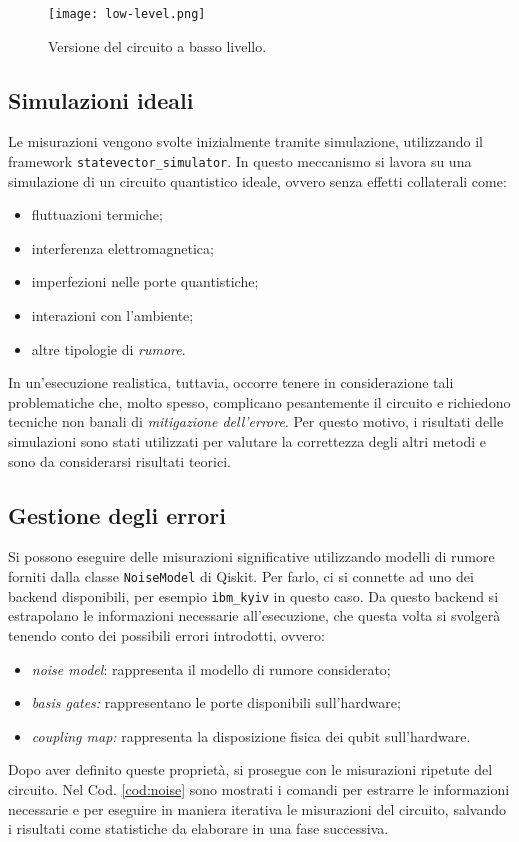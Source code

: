 \begin{figure}[ht]
    \texttt{[image: low-level.png]}
    \caption{Versione del circuito a basso livello.}
\end{figure}

\subsection{Simulazioni ideali}
Le misurazioni vengono svolte inizialmente tramite simulazione, utilizzando 
il framework \texttt{statevector\_simulator}. In questo meccanismo si lavora su 
una simulazione di un circuito quantistico ideale, ovvero senza effetti collaterali come:
\begin{itemize}
    \item fluttuazioni termiche;
    \item interferenza elettromagnetica;
    \item imperfezioni nelle porte quantistiche;
    \item interazioni con l'ambiente;
    \item altre tipologie di \textit{rumore}.
\end{itemize}
In un'esecuzione realistica, tuttavia, occorre tenere in considerazione
tali problematiche che, molto spesso, complicano pesantemente
il circuito e richiedono tecniche non banali di \textit{mitigazione dell'errore}.
Per questo motivo, i risultati delle simulazioni sono stati utilizzati per 
valutare la correttezza degli altri metodi e sono da considerarsi risultati teorici.

\subsection{Gestione degli errori}
Si possono eseguire delle misurazioni significative utilizzando modelli 
di rumore forniti dalla classe \texttt{NoiseModel} di Qiskit. 
Per farlo, ci si connette ad uno dei backend disponibili, per esempio 
\texttt{ibm\_kyiv} in questo caso. Da questo backend si estrapolano le 
informazioni necessarie all'esecuzione, che questa volta si svolgerà
tenendo conto dei possibili errori introdotti, ovvero:
\begin{itemize}
	\item \emph{noise model}: rappresenta il modello di rumore considerato;
		\item \emph{basis gates:} rappresentano le porte disponibili sull'hardware;
		\item \emph{coupling map:} rappresenta la disposizione fisica dei qubit sull'hardware.
\end{itemize}
Dopo aver definito queste proprietà, si prosegue con le misurazioni 
ripetute del circuito. Nel Cod. \ref{cod:noise} sono mostrati 
i comandi per estrarre le informazioni necessarie e per eseguire 
in maniera iterativa le misurazioni del circuito, salvando i risultati 
come statistiche da elaborare in una fase successiva.


